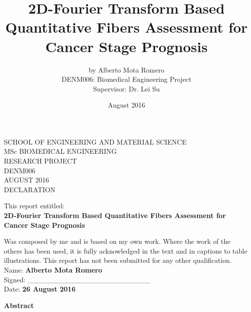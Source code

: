 \documentclass[12pt,a4paper]{article}
\begin{document}
\renewcommand{\baselinestretch}{1.50}\normalsize


\title{ 2D-Fourier Transform Based Quantitative Fibers Assessment for Cancer Stage Prognosis }
\author{by Alberto Mota Romero \\DENM006: Biomedical Engineering Project \\Supervisor: Dr. Lei Su}

\date{August 2016}
\maketitle
\thispagestyle{empty}


\newpage
\begin{center}
SCHOOL OF ENGINEERING AND MATERIAL SCIENCE \\[0.3in]

MSc BIOMEDICAL ENGINEERING \\
RESEARCH PROJECT \\
DENM006\\[0.3in]
AUGUST 2016\\[0.3in]
DECLARATION\\[0.5in]
\end{center}

This report entitled:\\[0.1in]

\textbf{2D-Fourier Transform Based Quantitative Fibers Assessment for Cancer Stage Prognosis\\[0.1in]}

Was composed by me and is based on my own work. Where the work of the others has been used, it is fully acknowledged in the text and in captions to table illustrations. This report has not been submitted for any other qualification.\\



Name: \textbf{Alberto Mota Romero} \\

Signed: \_\_\_\_\_\_\_\_\_\_\_\_\_\_\_\_\_\_\_\_\_\_\_\_ \\

Date: \textbf{26 August 2016}

\thispagestyle{empty}
\newpage



\LARGE\textbf{Abstract}\\[0.1in]
\normalsize
\end{document}
